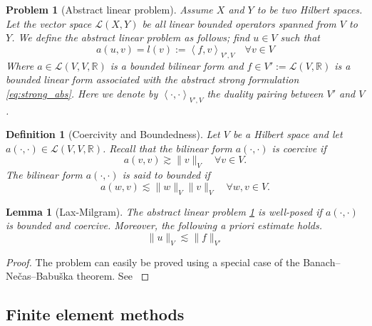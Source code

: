 \documentclass[11pt]{article}
\newtheorem{definition}[theorem]{Definition}
\newtheorem{problem}[theorem]{Problem}
\newtheorem{lemma}[theorem]{Lemma}
\theoremstyle{remark}
\numberwithin{equation}{section}
\begin{document}
\begin{problem}[Abstract linear problem]
    \label{def:abstract_linear_problem}
    Assume $X$ and $Y$  to be two Hilbert spaces. Let the vector space $\mathcal{L}( X,Y)  $ be all linear bounded operators spanned from $V$ to $Y$. We define the abstract linear problem as follows; find $u \in V$ such that
    \begin{equation}
    a( u,v)  = l(v ) := \left<f,v \right>_{V' , V}  \quad  \forall v \in V
    \end{equation}
    Where $a \in  \mathcal{L} ( V, V,\mathbb{R} ) $ is a bounded bilinear form and $f \in V':= \mathcal{L} ( V,\mathbb{R} )  $ is a bounded linear form associated with the abstract strong formulation \eqref{eq:strong_abs}. Here we denote by $\left<\cdot ,\cdot  \right>_{V',V} $ the duality pairing between $V'$ and $V$.

\end{problem}


\begin{definition}[Coercivity and Boundedness]
    \label{def:coercivity}
    Let $V$ be a Hilbert space and let $a( \cdot ,\cdot )  \in  \mathcal{L} ( V, V,\mathbb{R} )  $. Recall that the bilinear form $a( \cdot ,\cdot ) $ is coercive if \[
     a( v,v) \gtrsim  \| v \|_{ V }^{  } \quad  \forall v \in  V.
    \]
     The bilinear form $a( \cdot ,\cdot ) $ is said to bounded if   \[
    a( w,v)  \lesssim  \| w \|_{ V }^{  }  \| v \|_{V }^{  }\quad  \forall w,v \in V.
    \]
\end{definition}


\begin{lemma}[Lax-Milgram]
    \label{def:lax-milgram}
    The abstract linear problem \ref{def:abstract_linear_problem} is well-posed if $a(\cdot , \cdot  ) $ is bounded and coercive. Moreover, the following a priori estimate holds.
    \begin{equation}
    \| u \|_{ V }^{  } \lesssim  \| f \|_{ V'  }^{  }
    \end{equation}
\end{lemma}
\begin{proof}
    The problem can easily be proved using a special case of the Banach–Nečas–Babuška theorem. See \cite[Lemma 1.4]{pietro2012}
\end{proof}


\subsection{Finite element methods}%
\label{sub:finite_element_method}
\end{document}

